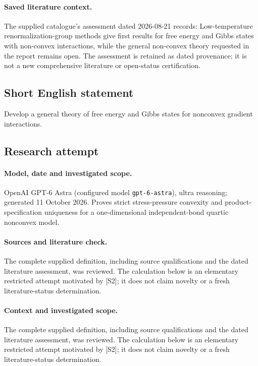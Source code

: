 \documentclass[11pt]{article}
\begin{document}
\paragraph{Saved literature context.} The supplied catalogue's assessment dated 2026-08-21 records: Low-temperature renormalization-group methods give first results for free energy and Gibbs states with non-convex interactions, while the general non-convex theory requested in the report remains open. The assessment is retained as dated provenance; it is not a new comprehensive literature or open-status certification.
\subsection{Short English statement}
Develop a general theory of free energy and Gibbs states for nonconvex gradient interactions.
\subsection{Research attempt}
\paragraph{Model, date and investigated scope.}
OpenAI GPT-6 Astra (configured model \texttt{gpt-6-astra}), ultra reasoning; generated 11 October 2026. Proves strict stress-pressure convexity and product-specification uniqueness for a one-dimensional independent-bond quartic nonconvex model.

\paragraph{Sources and literature check.}
The complete supplied definition, including source qualifications and the dated literature assessment, was reviewed. The calculation below is an elementary restricted attempt motivated by [S2]; it does not claim novelty or a fresh literature-status determination.

\paragraph{Context and investigated scope.} The complete supplied definition, including source qualifications and the dated literature assessment, was reviewed. The calculation below is an elementary restricted attempt motivated by [S2]; it does not claim novelty or a fresh literature-status determination.
\end{document}
